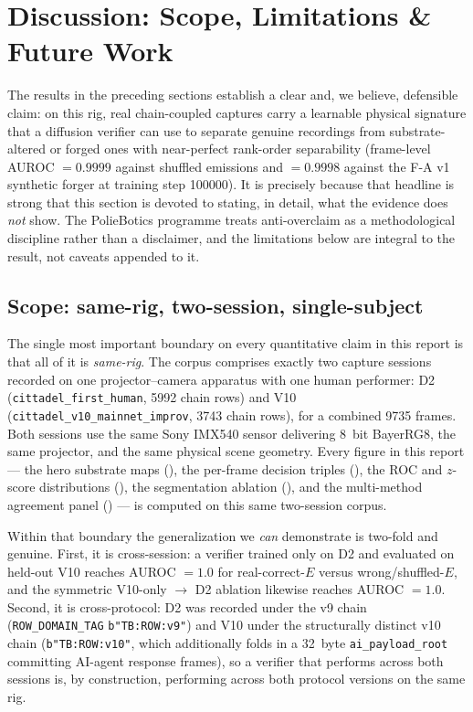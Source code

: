 \section{Discussion: Scope, Limitations \& Future Work}\label{sec:discussion}

The results in the preceding sections establish a clear and, we believe, defensible claim: on this rig, real chain-coupled captures carry a learnable physical signature that a diffusion verifier can use to separate genuine recordings from substrate-altered or forged ones with near-perfect rank-order separability (frame-level AUROC $=0.9999$ against shuffled emissions and $=0.9998$ against the F-A v1 synthetic forger at training step \num{100000}). It is precisely because that headline is strong that this section is devoted to stating, in detail, what the evidence does \emph{not} show. The PolieBotics programme treats anti-overclaim as a methodological discipline rather than a disclaimer, and the limitations below are integral to the result, not caveats appended to it.

\subsection{Scope: same-rig, two-session, single-subject}\label{sec:discussion:scope}

The single most important boundary on every quantitative claim in this report is that all of it is \emph{same-rig}. The corpus comprises exactly two capture sessions recorded on one projector--camera apparatus with one human performer: D2 (\texttt{cittadel\_first\_human}, \num{5992} chain rows) and V10 (\texttt{cittadel\_v10\_mainnet\_improv}, \num{3743} chain rows), for a combined \num{9735} frames. Both sessions use the same Sony IMX540 sensor delivering \SI{8}{bit} BayerRG8, the same projector, and the same physical scene geometry. Every figure in this report --- the hero substrate maps (), the per-frame decision triples (), the ROC and $z$-score distributions (), the segmentation ablation (), and the multi-method agreement panel () --- is computed on this same two-session corpus.

Within that boundary the generalization we \emph{can} demonstrate is two-fold and genuine. First, it is cross-session: a verifier trained only on D2 and evaluated on held-out V10 reaches AUROC $=1.0$ for real-correct-$E$ versus wrong/shuffled-$E$, and the symmetric V10-only $\rightarrow$ D2 ablation likewise reaches AUROC $=1.0$. Second, it is cross-protocol: D2 was recorded under the v9 chain (\texttt{ROW\_DOMAIN\_TAG} \texttt{b"TB:ROW:v9"}) and V10 under the structurally distinct v10 chain (\texttt{b"TB:ROW:v10"}, which additionally folds in a \SI{32}{byte} \texttt{ai\_payload\_root} committing AI-agent response frames), so a verifier that performs across both sessions is, by construction, performing across both protocol versions on the same rig.

